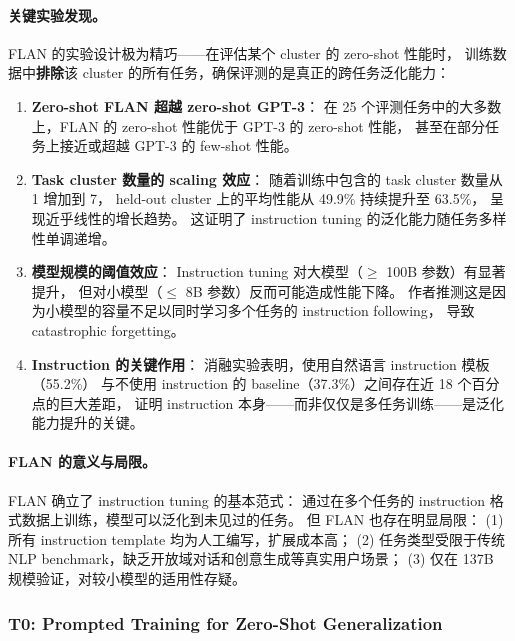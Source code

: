 \paragraph{关键实验发现。}
FLAN 的实验设计极为精巧——在评估某个 cluster 的 zero-shot 性能时，
训练数据中\textbf{排除}该 cluster 的所有任务，确保评测的是真正的跨任务泛化能力：

\begin{enumerate}[leftmargin=1.5em]
  \item \textbf{Zero-shot FLAN 超越 zero-shot GPT-3}：
    在 25 个评测任务中的大多数上，FLAN 的 zero-shot 性能优于 GPT-3 的 zero-shot 性能，
    甚至在部分任务上接近或超越 GPT-3 的 few-shot 性能。

  \item \textbf{Task cluster 数量的 scaling 效应}：
    随着训练中包含的 task cluster 数量从 1 增加到 7，
    held-out cluster 上的平均性能从 49.9\% 持续提升至 63.5\%，
    呈现近乎线性的增长趋势。
    这证明了 instruction tuning 的泛化能力随任务多样性单调递增。

  \item \textbf{模型规模的阈值效应}：
    Instruction tuning 对大模型（$\geq$ 100B 参数）有显著提升，
    但对小模型（$\leq$ 8B 参数）反而可能造成性能下降。
    作者推测这是因为小模型的容量不足以同时学习多个任务的 instruction following，
    导致 catastrophic forgetting。

  \item \textbf{Instruction 的关键作用}：
    消融实验表明，使用自然语言 instruction 模板（55.2\%）
    与不使用 instruction 的 baseline（37.3\%）之间存在近 18 个百分点的巨大差距，
    证明 instruction 本身——而非仅仅是多任务训练——是泛化能力提升的关键。
\end{enumerate}

\paragraph{FLAN 的意义与局限。}
FLAN 确立了 instruction tuning 的基本范式：
通过在多个任务的 instruction 格式数据上训练，模型可以泛化到未见过的任务。
但 FLAN 也存在明显局限：
(1) 所有 instruction template 均为人工编写，扩展成本高；
(2) 任务类型受限于传统 NLP benchmark，缺乏开放域对话和创意生成等真实用户场景；
(3) 仅在 137B 规模验证，对较小模型的适用性存疑。


\subsubsection{T0: Prompted Training for Zero-Shot Generalization}
\label{sec:t1-t0}

